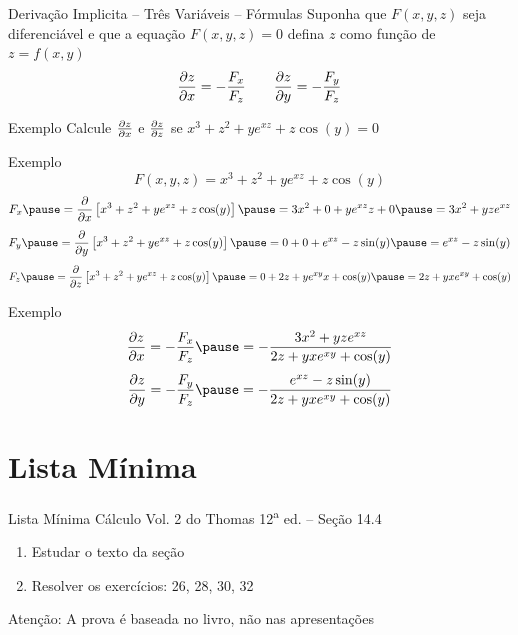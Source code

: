 \begin{frame}{Derivação Implicita -- Três Variáveis -- Fórmulas}
  Suponha que $F(x, y, z)$ seja diferenciável e que a equação $F(x, y, z)=0$
  defina $z$ como função de $z=f(x, y)$
  \[
    \frac{\partial {z}}{\partial {x}} = -\frac{F_x}{F_z} \qquad
    \frac{\partial {z}}{\partial {y}} = -\frac{F_y}{F_z}
  \]
\end{frame}

\addtocounter{exemplo}{1}
\begin{frame}{Exemplo \theexemplo}
  Calcule \(\frac{\partial {z}}{\partial {x}}\) e \(\frac{\partial {z}}{\partial {z}}\) se \(x^3 + z^2 + ye^{xz} + z\cos(y) = 0\)
\end{frame}

\begin{frame}{Exemplo \theexemplo}
  \[
    F(x, y, z) = x^3 + z^2 + ye^{xz} + z\cos(y)
  \]
  \pause
  \[
    F_x
    \pause
    = \D{}{x}\left[x^3 + z^2 + ye^{xz} + z\cos(y)\right]
    \pause
    = 3x^2 + 0 + ye^{xz}z + 0
    \pause
    = 3x^2 + yze^{xz}
  \]
  \pause
  \[
    F_y
    \pause
    = \D{}{y}\left[x^3 + z^2 + ye^{xz} + z\cos(y)\right]
    \pause
    = 0 + 0 + e^{xz} -z\sin(y)
    \pause
    = e^{xz} -z\sin(y)
  \]
  \pause
  \[
    F_z
    \pause
    = \D{}{z}\left[x^3 + z^2 + ye^{xz} + z\cos(y)\right]
    \pause
    = 0 + 2z + ye^{xy}x + \cos(y)
    \pause
    = 2z + yxe^{xy} + \cos(y)
  \]
\end{frame}

\begin{frame}{Exemplo \theexemplo}
  \[
    \D{z}{x}
    = -\frac{F_x}{F_z}
    \pause
    = -\frac{3x^2 + yze^{xz}}{2z + yxe^{xy} + \cos(y)}
  \]
  \pause
  \[
    \D{z}{y}
    = -\frac{F_y}{F_z}
    \pause
    = -\frac{e^{xz} -z\sin(y)}{2z + yxe^{xy} + \cos(y)}
  \]
\end{frame}

\section{Lista Mínima}

\begin{frame}{Lista Mínima}
  Cálculo Vol. 2 do Thomas 12\textsuperscript{a} ed. -- Seção 14.4
  \begin{enumerate}
    \item Estudar o texto da seção
    \item Resolver os exercícios: 26, 28, 30, 32
  \end{enumerate}
  \vfill
  Atenção: A prova é baseada no livro, não nas apresentações
\end{frame}

\begin{frame}
  \tableofcontents
\end{frame}



